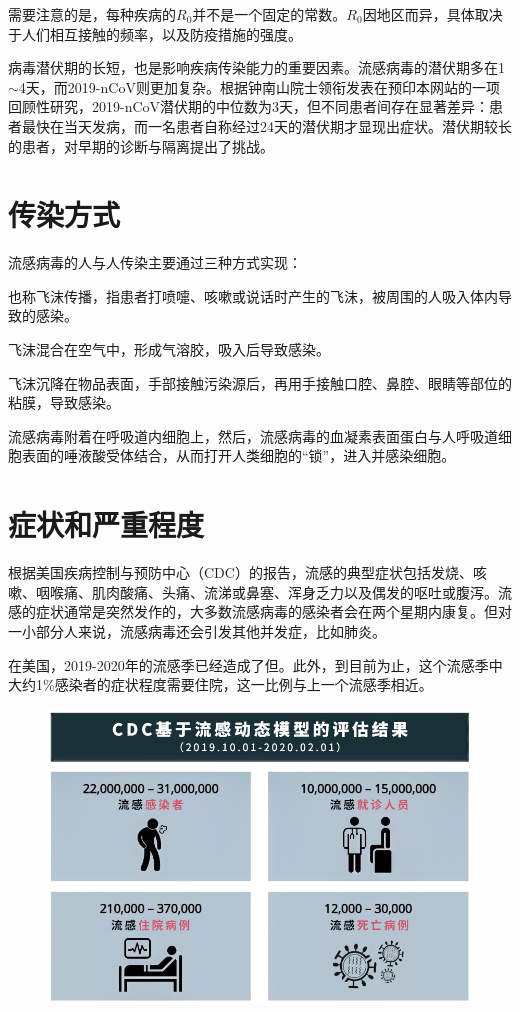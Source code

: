 \begin{multicols}{3}
需要注意的是，每种疾病的$R_0$并不是一个固定的常数。$R_0$因地区而异，具体取决于人们相互接触的频率，以及防疫措施的强度。

病毒潜伏期的长短，也是影响疾病传染能力的重要因素。流感病毒的潜伏期多在1$\sim 
$4天，而2019-nCoV则更加复杂。根据钟南山院士领衔发表在预印本网站的一项回顾性研究，2019-nCoV潜伏期的中位数为3天，但不同患者间存在显著差异：患者最快在当天发病，而一名患者自称经过24天的潜伏期才显现出症状。潜伏期较长的患者，对早期的诊断与隔离提出了挑战。

\section*{传染方式}
流感病毒的人与人传染主要通过三种方式实现：

\noindent{}\quad 也称飞沫传播，指患者打喷嚏、咳嗽或说话时产生的飞沫，被周围的人吸入体内导致的感染。

\noindent{}\quad 飞沫混合在空气中，形成气溶胶，吸入后导致感染。

\noindent{}\quad 飞沫沉降在物品表面，手部接触污染源后，再用手接触口腔、鼻腔、眼睛等部位的粘膜，导致感染。

流感病毒附着在呼吸道内细胞上，然后，流感病毒的血凝素表面蛋白与人呼吸道细胞表面的唾液酸受体结合，从而打开人类细胞的``锁''，进入并感染细胞。

\section*{症状和严重程度}
根据美国疾病控制与预防中心（CDC）的报告，流感的典型症状包括发烧、咳嗽、咽喉痛、肌肉酸痛、头痛、流涕或鼻塞、浑身乏力以及偶发的呕吐或腹泻。流感的症状通常是突然发作的，大多数流感病毒的感染者会在两个星期内康复。但对一小部分人来说，流感病毒还会引发其他并发症，比如肺炎。

在美国，2019-2020年的流感季已经造成了但。此外，到目前为止，这个流感季中大约1{\%}感染者的症状程度需要住院，这一比例与上一个流感季相近。

\begin{figure}[H]
\centerline{\includegraphics[width=\linewidth]{IMG/202001/新型冠状病毒肺炎VS美国流感11.png}}
\label{fig1}
\end{figure}


\end{multicols}
